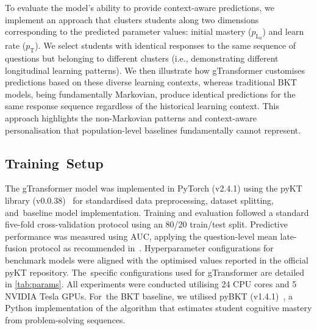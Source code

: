 \documentclass[applsci,article,accept,moreauthors,pdftex]{Definitions/mdpi}
\begin{document}
\subsubsection{\texorpdfstring{{\protect{}}}{Evaluation Protocols for Context-Aware Personalisation (RQ3)}} %
 \label{sec:rq3_method}

{To evaluate the model's ability to provide context-aware predictions, we implement an approach that clusters students along two dimensions corresponding to the predicted parameter values: initial mastery ($p_{\text{L}_0}$) and learn rate ($p_{\text{T}}$). We select students with identical responses to the same sequence of questions but belonging to different clusters (i.e., demonstrating different longitudinal learning patterns). We then illustrate how gTransformer customises predictions based on these diverse learning contexts, whereas traditional BKT models, being fundamentally Markovian, produce identical predictions for the same response sequence regardless of the historical learning context. This approach highlights the non-Markovian patterns and context-aware personalisation that population-level baselines fundamentally cannot represent.}

\subsection{Training~Setup}

The gTransformer model was implemented in PyTorch (v2.4.1) using the pyKT library (v0.0.38)~\citep{liu2022pykt} for standardised data preprocessing, dataset splitting, and~baseline model implementation. Training and evaluation followed a standard five-fold cross-validation protocol using an 80/20 train/test split. Predictive performance was measured using AUC, applying the question-level mean late-fusion protocol as recommended in~\cite{liu2022pykt}. Hyperparameter configurations for benchmark models were aligned with the {optimised} values reported in the official pyKT repository. The~specific configurations used for gTransformer are detailed in \cref{tab:params}. {All experiments were conducted utilising 24 CPU cores and 5 NVIDIA Tesla GPUs.} For~the BKT baseline, we utilised pyBKT (v1.4.1)~\citep{badrinath2021pybkt}, a Python implementation of the algorithm that estimates student cognitive mastery from problem-solving sequences.
\end{document}
